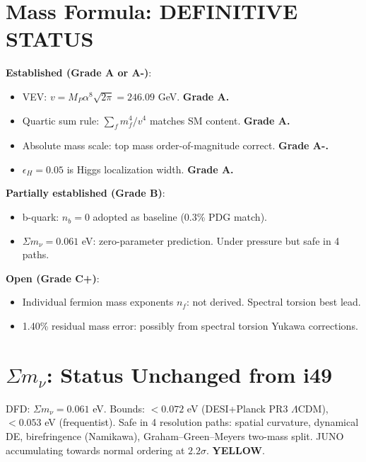\documentclass[11pt,a4paper]{article}
\newcommand{\YELLOW}{\textcolor{dfdyellow}{\textbf{YELLOW}}}
\begin{document}
\section{Mass Formula: DEFINITIVE STATUS}

\begin{tcolorbox}[colback=green!5!white, colframe=green!60!black,
  title={Mass Formula: Final Status for Programme Handoff}]

\textbf{Established (Grade A or A-)}:
\begin{itemize}
\item VEV: $v = M_P \alpha^8 \sqrt{2\pi} = 246.09$ GeV. \textbf{Grade A.}
\item Quartic sum rule: $\sum_f m_f^4 / v^4$ matches SM content. \textbf{Grade A.}
\item Absolute mass scale: top mass order-of-magnitude correct. \textbf{Grade A-.}
\item $\epsilon_H = 0.05$ is Higgs localization width. \textbf{Grade A.}
\end{itemize}

\textbf{Partially established (Grade B)}:
\begin{itemize}
\item b-quark: $n_b = 0$ adopted as baseline (0.3\% PDG match).
\item $\Sigma m_\nu = 0.061$ eV: zero-parameter prediction. Under pressure but safe in 4 paths.
\end{itemize}

\textbf{Open (Grade C+)}:
\begin{itemize}
\item Individual fermion mass exponents $n_f$: not derived. Spectral torsion best lead.
\item 1.40\% residual mass error: possibly from spectral torsion Yukawa corrections.
\end{itemize}
\end{tcolorbox}

\section{$\Sigma m_\nu$: Status Unchanged from i49}

DFD: $\Sigma m_\nu = 0.061$ eV. Bounds: $< 0.072$ eV (DESI+Planck PR3 $\Lambda$CDM), $< 0.053$ eV (frequentist). Safe in 4 resolution paths: spatial curvature, dynamical DE, birefringence (Namikawa), Graham--Green--Meyers two-mass split. JUNO accumulating towards normal ordering at $2.2\sigma$. \YELLOW.
\end{document}
